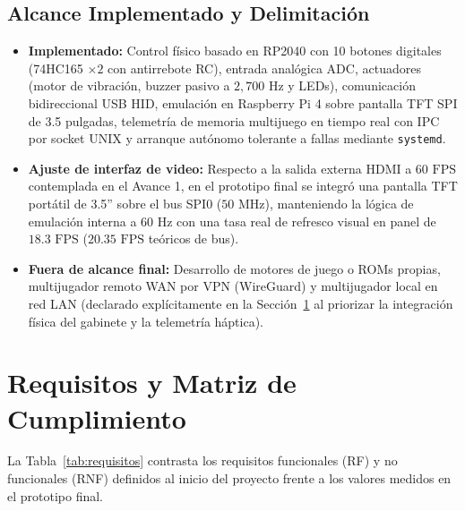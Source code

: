 \documentclass[conference]{IEEEtran}
\begin{document}
\subsection{Alcance Implementado y Delimitación}
\begin{itemize}
	\item \textbf{Implementado:} Control físico basado en RP2040 con 10 botones digitales (74HC165 $\times 2$ con antirrebote RC), entrada analógica ADC, actuadores (motor de vibración, buzzer pasivo a $2{,}700\text{ Hz}$ y LEDs), comunicación bidireccional USB HID, emulación en Raspberry Pi 4 sobre pantalla TFT SPI de 3.5 pulgadas, telemetría de memoria multijuego en tiempo real con IPC por socket UNIX y arranque autónomo tolerante a fallas mediante \texttt{systemd}.
	\item \textbf{Ajuste de interfaz de video:} Respecto a la salida externa HDMI a $60\text{ FPS}$ contemplada en el Avance 1, en el prototipo final se integró una pantalla TFT portátil de 3.5'' sobre el bus SPI0 ($50\text{ MHz}$), manteniendo la lógica de emulación interna a $60\text{ Hz}$ con una tasa real de refresco visual en panel de $18.3\text{ FPS}$ ($20.35\text{ FPS}$ teóricos de bus).
	\item \textbf{Fuera de alcance final:} Desarrollo de motores de juego o ROMs propias, multijugador remoto WAN por VPN (WireGuard) y multijugador local en red LAN (declarado explícitamente en la Sección~\ref{sec:requisitos} al priorizar la integración física del gabinete y la telemetría háptica).
\end{itemize}

\section{Requisitos y Matriz de Cumplimiento}
\label{sec:requisitos}

La Tabla~\ref{tab:requisitos} contrasta los requisitos funcionales (RF) y no funcionales (RNF) definidos al inicio del proyecto frente a los valores medidos en el prototipo final.
\end{document}
